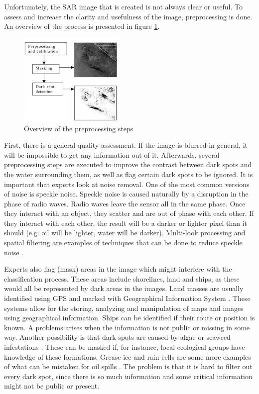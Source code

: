 Unfortunately, the SAR image that is created is not always clear or useful. To assess and increase the clarity and usefulness of the image, preprocessing is done. An overview of the process is presented in figure \ref{fig:overview}.
\begin{figure}[H]
	\centering
    \includegraphics[width=50mm,scale=0.3]{./img/preprocessing_diagram.png}
    \caption{\footnotesize{Overview of the preprocessing steps \cite{Solberg200745}}}
    \label{fig:overview}
\end{figure}
First, there is a general quality assessment. If the image is blurred in general, it will be impossible to get any information out of it.
Afterwards, several preprocessing steps are executed to improve the contrast between dark spots and the water surrounding them, as well as flag certain dark spots to be ignored. 
It is important that experts look at noise removal. One of the most common versions of noise is speckle noise. Speckle noise is caused naturally by a disruption in the phase of radio waves. Radio waves leave the sensor all in the same phase. Once they interact with an object, they scatter and are out of phase with each other. If they interact with each other, the result will be a darker or lighter pixel than it should (e.g. oil will be lighter, water will be darker). Multi-look processing and spatial filtering are examples of techniques that can be done to reduce speckle noise \cite{simard1998analysis}.

Experts also flag (mask) areas in the image which might interfere with the classification process. These areas include shorelines, land and ships, as these would all be represented by dark areas in the images. Land masses are usually identified using GPS and marked with Geographical Information System \cite{star1990geographic}. These systems allow for the storing, analyzing and manipulation of maps and images using geographical information. Ships can be identified if their route or position is known. A problems arises when the information is not public or missing in some way.
Another possibility is that dark spots are caused by algae or seaweed infestations \cite{fingas2014review}. These can be masked if, for instance, local ecological groups have knowledge of these formations. Grease ice and rain cells are some more examples of what can be mistaken for oil spills \cite{Brekke200595}. The problem is that it is hard to filter out every dark spot, since there is so much information and some critical information might not be public or present.


